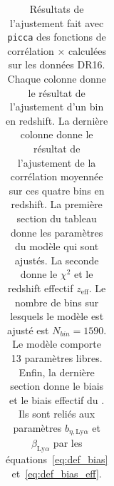 \begin{table}[]
  \centering
  \caption{Résultats de l'ajustement fait avec \texttt{picca} des fonctions de corrélation \lya{}$\times$\lya{} calculées sur les données DR16. Chaque colonne donne le résultat de l'ajustement d'un bin en redshift. La dernière colonne donne le résultat de l'ajustement de la corrélation moyennée sur ces quatre bins en redshift. La première section du tableau donne les paramètres du modèle qui sont ajustés. La seconde donne le $\chi^2$ et le redshift effectif $z_{\mathrm{eff}}$. Le nombre de bins sur lesquels le modèle est ajusté est $N_{bin} = \num{1590}$. Le modèle comporte \num{13} paramètres libres. Enfin, la dernière section donne le biais et le biais effectif du \lya{}. Ils sont reliés aux paramètres $b_{\eta, \mathrm{Ly}\alpha}$ et $\beta_{\mathrm{Ly}\alpha}$ par les équations~\ref{eq:def_bias} et~\ref{eq:def_bias_eff}.}
  \label{tab:dr16_4bins}
  \footnotesize
  \begin{tabular}{lccccc}

\end{tabular}
\end{table}
